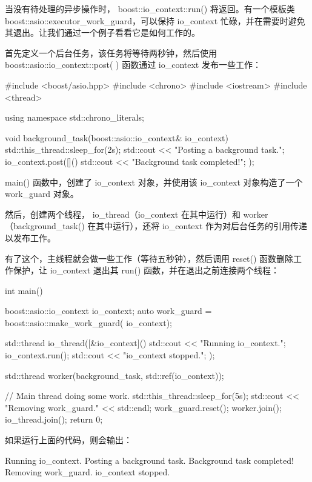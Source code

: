 当没有待处理的异步操作时， boost::io\_context::run() 将返回。有一个模板类 boost::asio::executor\_work\_guard，可以保持 io\_context 忙碌，并在需要时避免其退出。让我们通过一个例子看看它是如何工作的。

首先定义一个后台任务，该任务将等待两秒钟，然后使用 boost::asio::io\_context::post( ) 函数通过 io\_context 发布一些工作：

\begin{cpp}
#include <boost/asio.hpp>
#include <chrono>
#include <iostream>
#include <thread>

using namespace std::chrono_literals;

void background_task(boost::asio::io_context& io_context) {
    std::this_thread::sleep_for(2s);
    std::cout << "Posting a background task.\n";
    io_context.post([]() {
        std::cout << "Background task completed!\n";
    });
}
\end{cpp}

main() 函数中，创建了 io\_context 对象，并使用该 io\_context 对象构造了一个 work\_guard 对象。

然后，创建两个线程， io\_thread（io\_context 在其中运行）和 worker（background\_task() 在其中运行），还将 io\_context 作为对后台任务的引用传递以发布工作。

有了这个，主线程就会做一些工作（等待五秒钟），然后调用 reset() 函数删除工作保护，让 io\_context 退出其 run() 函数，并在退出之前连接两个线程：

\begin{cpp}
int main() {
    boost::asio::io_context io_context;
    auto work_guard = boost::asio::make_work_guard(
                      io_context);

    std::thread io_thread([&io_context]() {
        std::cout << "Running io_context.\n";
        io_context.run();
        std::cout << "io_context stopped.\n";
    });

    std::thread worker(background_task,
                        std::ref(io_context));

    // Main thread doing some work.
    std::this_thread::sleep_for(5s);
    std::cout << "Removing work_guard." << std::endl;
    work_guard.reset();
    worker.join();
    io_thread.join();
    return 0;
}
\end{cpp}

如果运行上面的代码，则会输出：

\begin{shell}
Running io_context.
Posting a background task.
Background task completed!
Removing work_guard.
io_context stopped.
\end{shell}

